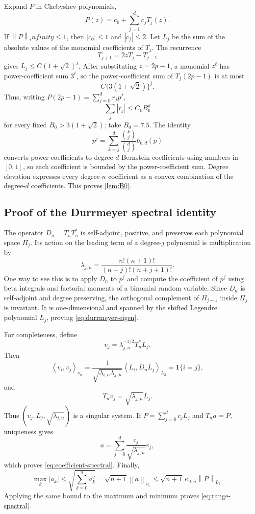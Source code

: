 \documentclass[11pt]{article}
\def\infty{infinity}%
\newcommand{\one}{\mathbf 1}
\newcommand{\norm}[1]{\left\lVert#1\right\rVert}
\newcommand{\inner}[2]{\left\langle#1,#2\right\rangle}
\begin{document}
Expand $P$ in Chebyshev polynomials,
\[
P(z)=c_0+\sum_{j=1}^dc_jT_j(z).
\]
If $\norm P_\infty\le1$, then $|c_0|\le1$ and $|c_j|\le2$.  Let $L_j$ be the sum of the absolute values of the monomial coefficients of $T_j$.  The recurrence
\[
T_{j+1}=2zT_j-T_{j-1}
\]
gives $L_j\le C(1+\sqrt2)^j$.  After substituting $z=2p-1$, a monomial $z^\ell$ has power-coefficient sum $3^\ell$, so the power-coefficient sum of $T_j(2p-1)$ is at most
\[
C\{3(1+\sqrt2)\}^j.
\]
Thus, writing $P(2p-1)=\sum_{j=0}^dr_jp^j$,
\[
\sum_j|r_j|\le C_0B_0^d
\]
for every fixed $B_0>3(1+\sqrt2)$; take $B_0=7.5$.  The identity
\[
p^j
=
\sum_{k=j}^d
\frac{\binom kj}{\binom dj}b_{k,d}(p)
\]
converts power coefficients to degree-$d$ Bernstein coefficients using numbers in $[0,1]$, so each coefficient is bounded by the power-coefficient sum.  Degree elevation expresses every degree-$n$ coefficient as a convex combination of the degree-$d$ coefficients.  This proves \cref{lem:B0}.

\subsection{Proof of the Durrmeyer spectral identity}
\label{app:durrmeyer}

The operator $D_n=T_nT_n^*$ is self-adjoint, positive, and preserves each polynomial space $\Pi_j$.  Its action on the leading term of a degree-$j$ polynomial is multiplication by
\[
\lambda_{j,n}
=
\frac{n!(n+1)!}{(n-j)!(n+j+1)!}.
\]
One way to see this is to apply $D_n$ to $p^j$ and compute the coefficient of $p^j$ using beta integrals and factorial moments of a binomial random variable.  Since $D_n$ is self-adjoint and degree preserving, the orthogonal complement of $\Pi_{j-1}$ inside $\Pi_j$ is invariant.  It is one-dimensional and spanned by the shifted Legendre polynomial $L_j$, proving \eqref{eq:durrmeyer-eigen}.

For completeness, define
\[
v_j=\lambda_{j,n}^{-1/2}T_n^*L_j.
\]
Then
\[
\inner{v_i}{v_j}_{\nu_n}
=
\frac{1}{\sqrt{\lambda_{i,n}\lambda_{j,n}}}
\inner{L_i}{D_nL_j}_{L_2}
=\one\{i=j\},
\]
and
\[
T_nv_j=\sqrt{\lambda_{j,n}}L_j.
\]
Thus $(v_j,L_j,\sqrt{\lambda_{j,n}})$ is a singular system.  If $P=\sum_{j=0}^dc_jL_j$ and $T_na=P$, uniqueness gives
\[
a=\sum_{j=0}^d\frac{c_j}{\sqrt{\lambda_{j,n}}}v_j,
\]
which proves \eqref{eq:coefficient-spectral}.  Finally,
\[
\max_k|a_k|
\le
\sqrt{\sum_{k=0}^na_k^2}
=
\sqrt{n+1}\norm a_{\nu_n}
\le
\sqrt{n+1}\,\kappa_{d,n}\norm P_{L_2}.
\]
Applying the same bound to the maximum and minimum proves \eqref{eq:range-spectral}.
\end{document}
